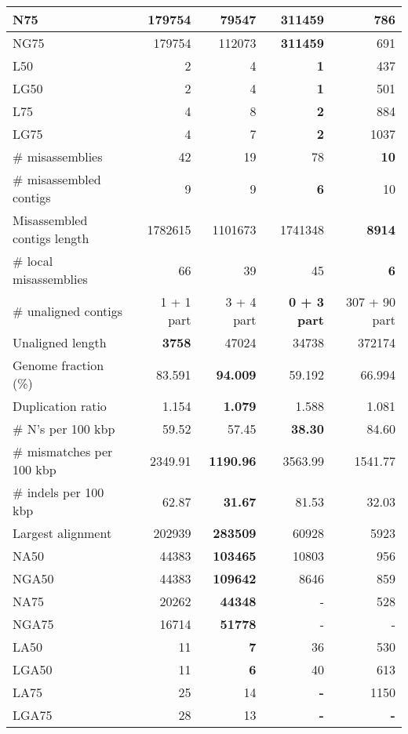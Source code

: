 \documentclass[12pt,a4paper]{article}
\begin{document}
\begin{table}[ht]
\begin{center}
\begin{tabular}{|l*{4}{|r}|}
N75 & 179754 & 79547 & {\bf 311459} & 786 \\ \hline
NG75 & 179754 & 112073 & {\bf 311459} & 691 \\ \hline
L50 & 2 & 4 & {\bf 1} & 437 \\ \hline
LG50 & 2 & 4 & {\bf 1} & 501 \\ \hline
L75 & 4 & 8 & {\bf 2} & 884 \\ \hline
LG75 & 4 & 7 & {\bf 2} & 1037 \\ \hline
\# misassemblies & 42 & 19 & 78 & {\bf 10} \\ \hline
\# misassembled contigs & 9 & 9 & {\bf 6} & 10 \\ \hline
Misassembled contigs length & 1782615 & 1101673 & 1741348 & {\bf 8914} \\ \hline
\# local misassemblies & 66 & 39 & 45 & {\bf 6} \\ \hline
\# unaligned contigs & 1 + 1 part & 3 + 4 part & {\bf 0 + 3 part} & 307 + 90 part \\ \hline
Unaligned length & {\bf 3758} & 47024 & 34738 & 372174 \\ \hline
Genome fraction (\%) & 83.591 & {\bf 94.009} & 59.192 & 66.994 \\ \hline
Duplication ratio & 1.154 & {\bf 1.079} & 1.588 & 1.081 \\ \hline
\# N's per 100 kbp & 59.52 & 57.45 & {\bf 38.30} & 84.60 \\ \hline
\# mismatches per 100 kbp & 2349.91 & {\bf 1190.96} & 3563.99 & 1541.77 \\ \hline
\# indels per 100 kbp & 62.87 & {\bf 31.67} & 81.53 & 32.03 \\ \hline
Largest alignment & 202939 & {\bf 283509} & 60928 & 5923 \\ \hline
NA50 & 44383 & {\bf 103465} & 10803 & 956 \\ \hline
NGA50 & 44383 & {\bf 109642} & 8646 & 859 \\ \hline
NA75 & 20262 & {\bf 44348} & - & 528 \\ \hline
NGA75 & 16714 & {\bf 51778} & - & - \\ \hline
LA50 & 11 & {\bf 7} & 36 & 530 \\ \hline
LGA50 & 11 & {\bf 6} & 40 & 613 \\ \hline
LA75 & 25 & 14 & {\bf -} & 1150 \\ \hline
LGA75 & 28 & 13 & {\bf -} & {\bf -} \\ \hline
\end{tabular}
\end{center}
\end{table}
\end{document}
